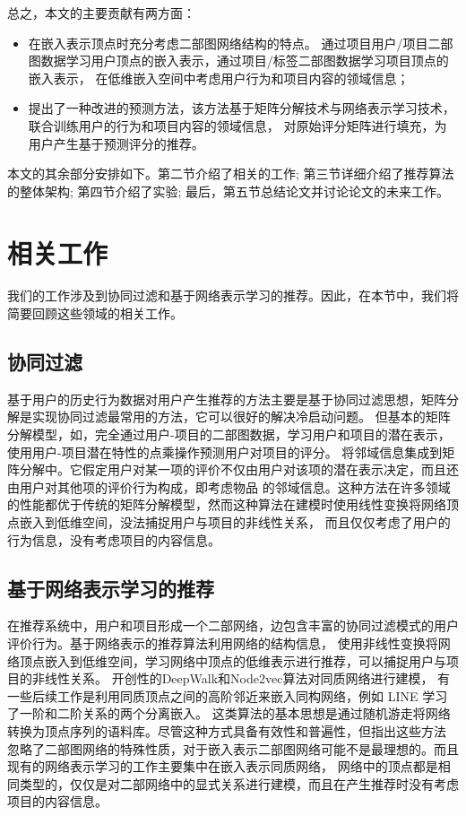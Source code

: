 \documentclass[lang=cn,11pt]{elegantpaper}
\begin{document}
总之，本文的主要贡献有两方面：
\begin{itemize}
    \item 在嵌入表示顶点时充分考虑二部图网络结构的特点。
    通过项目用户/项目二部图数据学习用户顶点的嵌入表示，通过项目/标签二部图数据学习项目顶点的嵌入表示，
    在低维嵌入空间中考虑用户行为和项目内容的领域信息；
	
    \item 提出了一种改进的预测方法，该方法基于矩阵分解技术与网络表示学习技术，联合训练用户的行为和项目内容的领域信息，
    对原始评分矩阵进行填充，为用户产生基于预测评分的推荐。
\end{itemize}

本文的其余部分安排如下。第二节介绍了相关的工作; 第三节详细介绍了推荐算法的整体架构; 第四节介绍了实验; 最后，第五节总结论文并讨论论文的未来工作。

\section{相关工作}

我们的工作涉及到协同过滤和基于网络表示学习的推荐。因此，在本节中，我们将简要回顾这些领域的相关工作。

\subsection{协同过滤}

基于用户的历史行为数据对用户产生推荐的方法主要是基于协同过滤思想\cite{Su2009}，矩阵分解是实现协同过滤最常用的方法，它可以很好的解决冷启动问题\cite{Qiu2011}。
但基本的矩阵分解模型，如\cite{Salakhutdinov2007,Koren2009}，完全通过用户-项目的二部图数据，学习用户和项目的潜在表示，使用用户-项目潜在特性的点乘操作预测用户对项目的评分。
\cite{Koren2008}将邻域信息集成到矩阵分解中。它假定用户对某一项的评价不仅由用户对该项的潜在表示决定，而且还由用户对其他项的评价行为构成，即考虑物品
的邻域信息。这种方法在许多领域的性能都优于传统的矩阵分解模型，然而这种算法在建模时使用线性变换将网络顶点嵌入到低维空间，没法捕捉用户与项目的非线性关系，
而且仅仅考虑了用户的行为信息，没有考虑项目的内容信息。

\subsection{基于网络表示学习的推荐}

在推荐系统中，用户和项目形成一个二部网络，边包含丰富的协同过滤模式的用户评价行为\cite{He2017a}。基于网络表示的推荐算法利用网络的结构信息，
使用非线性变换将网络顶点嵌入到低维空间，学习网络中顶点的低维表示进行推荐\cite{Pongnumkul2018,Liu2009}，可以捕捉用户与项目的非线性关系。
开创性的DeepWalk\cite{Perozzi2014}和Node2vec\cite{Grover2016}算法对同质网络进行建模，
有一些后续工作是利用同质顶点之间的高阶邻近来嵌入同构网络，例如 LINE \cite{Tang2015}学习了一阶和二阶关系的两个分离嵌入。
这类算法的基本思想是通过随机游走将网络转换为顶点序列的语料库。尽管这种方式具备有效性和普遍性，但\cite{Gao2018}指出这些方法
忽略了二部图网络的特殊性质，对于嵌入表示二部图网络可能不是最理想的。而且现有的网络表示学习的工作主要集中在嵌入表示同质网络，
网络中的顶点都是相同类型的\cite{Grover2016,Perozzi2014,Liao2018}，仅仅是对二部网络中的显式关系进行建模，而且在产生推荐时没有考虑项目的内容信息。
\end{document}
